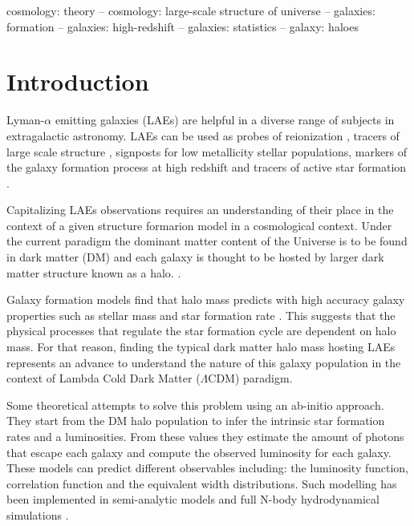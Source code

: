 \documentclass[usenatbib]{mn2e}
\newcommand{\ly}{{\ifmmode{{\rm Ly}\alpha}\else{Ly$\alpha$~}\fi}}
\begin{document}
\begin{keywords}
{cosmology: theory – cosmology: large-scale structure of universe –
  galaxies: formation – galaxies: high-redshift – galaxies: statistics
  – galaxy: haloes} 
\end{keywords}


\section{Introduction}

Lyman-$\alpha$ emitting galaxies (LAEs) are helpful in a diverse range
of subjects in extragalactic astronomy. LAEs can be
used as probes of reionization \citep{Dijkstra11}, tracers of large
scale structure \citep{Koehler2007},  signposts for low metallicity
stellar populations, markers of the galaxy formation process at high
redshift \citep{Dayal2009,ForeroRomero2012} and tracers of active star
formation \citep{Guaita2013}. 

Capitalizing LAEs observations requires an understanding of
their place in the context of a given structure formarion model in a
cosmological context. Under the current paradigm the dominant matter
content of the Universe is to be found in dark matter (DM) and each
galaxy is thought to be hosted by larger dark matter structure known
as a halo. \citep{Peebles1980,SpringelNature05}. 

Galaxy formation models find that halo mass predicts with high
accuracy galaxy properties such as stellar mass and star formation
rate \citep{Behroozi2013a}. This suggests that the
physical processes that regulate the star formation cycle are 
dependent on halo mass.  For that reason, finding the typical dark
matter halo mass hosting LAEs represents an advance to understand the
nature of this galaxy population in the context of Lambda Cold Dark
Matter ($\Lambda$CDM) paradigm.  

Some theoretical attempts to solve this problem using an  ab-initio
approach. They start from the DM halo population to infer the
intrinsic star formation rates and \ly a luminosities. From these
values they estimate the amount of \ly photons that
escape each galaxy and compute the observed luminosity for each
galaxy. These models can predict different observables including: the
luminosity function, correlation function and the equivalent width
distributions. Such modelling has been implemented in semi-analytic
models \citep{Garel2012,   Orsi2012, Solre2012} and  full N-body
hydrodynamical simulations \citep{Laursen2007, Dayal2009,
  ForeroRomero2011, Yajima2012}.     
\end{document}
